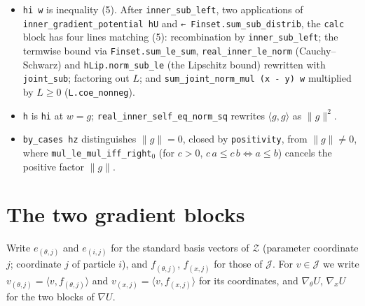 \documentclass[11pt,a4paper]{article}
\begin{document}
\begin{leanbox}
\begin{enumerate}
\begin{itemize}
\item \texttt{hi w} is inequality (5). After \texttt{inner\_\allowbreak{}sub\_\allowbreak{}left}, two applications of \texttt{inner\_\allowbreak{}gradient\_\allowbreak{}potential h\allowbreak{}U} and \texttt{← Finset.\allowbreak{}sum\_\allowbreak{}sub\_\allowbreak{}distrib}, the \texttt{calc} block has four lines matching (5): recombination by \texttt{inner\_\allowbreak{}sub\_\allowbreak{}left}; the termwise bound via \texttt{Finset.\allowbreak{}sum\_\allowbreak{}le\_\allowbreak{}sum}, \texttt{real\_\allowbreak{}inner\_\allowbreak{}le\_\allowbreak{}norm} (Cauchy–Schwarz) and \texttt{h\allowbreak{}Lip.\allowbreak{}norm\_\allowbreak{}sub\_\allowbreak{}le} (the Lipschitz bound) rewritten with \texttt{joint\_\allowbreak{}sub}; factoring out \(L\); and \texttt{sum\_\allowbreak{}joint\_\allowbreak{}norm\_\allowbreak{}mul (x -\allowbreak{} y) w} multiplied by \(L\ge0\) (\texttt{L.\allowbreak{}coe\_\allowbreak{}nonneg}).

\item \texttt{h} is \texttt{hi} at \(w=g\); \texttt{real\_\allowbreak{}inner\_\allowbreak{}self\_\allowbreak{}eq\_\allowbreak{}norm\_\allowbreak{}sq} rewrites \(\langle g,g\rangle\) as \(\|g\|^2\).

\item \texttt{by\_\allowbreak{}cases hz} distinguishes \(\|g\|=0\), closed by \texttt{positivity}, from \(\|g\|\neq0\), where \texttt{mul\_\allowbreak{}le\_\allowbreak{}mul\_\allowbreak{}iff\_\allowbreak{}right\ensuremath{{}_{0}}} (for \(c>0\), \(c\,a\le c\,b\iff a\le b\)) cancels the positive factor \(\|g\|\).

\end{itemize}


\end{enumerate}
\end{leanbox}

\section{\texorpdfstring{The two gradient blocks}{The two gradient blocks}}


Write \(e_{(\theta,j)}\) and \(e_{(i,j)}\) for the standard basis vectors of \(\mathcal Z\) (parameter coordinate \(j\); coordinate \(j\) of particle \(i\)), and \(f_{(\theta,j)}\), \(f_{(x,j)}\) for those of \(\mathcal J\). For \(v\in\mathcal J\) we write \(v_{(\theta,j)}=\langle v,f_{(\theta,j)}\rangle\) and \(v_{(x,j)}=\langle v,f_{(x,j)}\rangle\) for its coordinates, and \(\nabla_\theta U\), \(\nabla_xU\) for the two blocks of \(\nabla U\).
\end{document}
